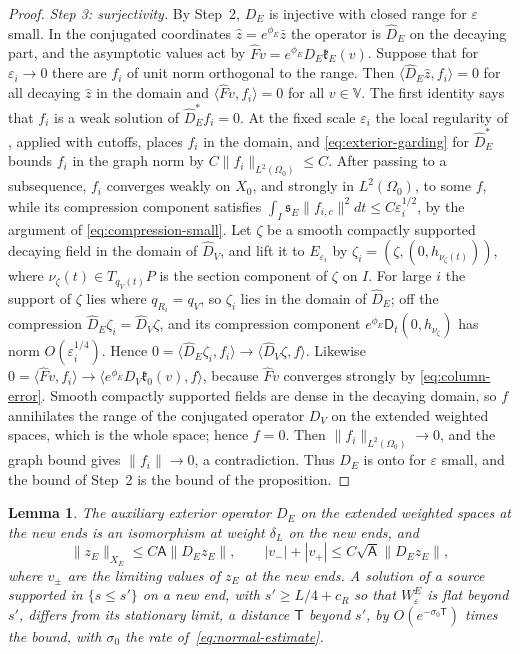 \documentclass[11pt]{amsart}
\newtheorem{lemma}[theorem]{Lemma}
\theoremstyle{definition}
\theoremstyle{remark}
\theoremstyle{plain}
\numberwithin{equation}{section}
\newcommand{\eps}{\varepsilon}
\begin{document}
\begin{proof}
\emph{Step 3: surjectivity.} By Step~2, $D_E$ is injective with closed range for
$\eps$ small. In the conjugated coordinates $\hat z=e^{\phi_E}\bar z$ the operator is
$\widehat D_E$ on the decaying part, and the asymptotic values act by $\widehat
Fv=e^{\phi_E}D_E\mathfrak k_E(v)$. Suppose that for $\eps_i\to0$ there are $f_i$ of
unit norm orthogonal to the range. Then $\langle\widehat D_E\hat z,f_i\rangle=0$
for all decaying $\hat z$ in the domain and $\langle\widehat Fv,f_i\rangle=0$ for all
$v\in\mathbb V$. The first identity says that $f_i$ is a weak solution of
$\widehat D_E^*f_i=0$. At the fixed scale $\eps_i$ the local regularity of
\cite[Theorem~4.17 and Remark~4.19]{DFL}, applied with cutoffs, places $f_i$ in the
domain, and \eqref{eq:exterior-garding} for $\widehat D_E^*$ bounds $f_i$ in the
graph norm by $C\|f_i\|_{L^2(\Omega_0)}\le C$. After passing to a subsequence, $f_i$
converges weakly on $X_0$, and strongly in $L^2(\Omega_0)$, to some $f$, while its
compression component satisfies $\int_I{\mathfrak s}_E\|f_{i,c}\|^2dt\le C\eps_i^{1/2}$, by
the argument of \eqref{eq:compression-small}. Let $\zeta$ be a smooth compactly
supported decaying field in the domain of $\widehat D_V$, and lift it to
$E_{\eps_i}$ by $\zeta_i=(\zeta,(0,h_{\nu_\zeta(t)}))$, where $\nu_\zeta(t)\in
T_{q_V(t)}P$ is the section component of $\zeta$ on $I$. For large $i$ the support of
$\zeta$ lies where $q_{R_i}=q_V$, so $\zeta_i$ lies in the domain of $\widehat D_E$;
off the compression $\widehat D_E\zeta_i=\widehat D_V\zeta$, and its compression
component $e^{\phi_E}\mathsf D_t(0,h_{\nu_\zeta})$ has norm $O(\eps_i^{1/4})$. Hence
$0=\langle\widehat D_E\zeta_i,f_i\rangle\to\langle\widehat D_V\zeta,f\rangle$.
Likewise $0=\langle\widehat Fv,f_i\rangle\to\langle e^{\phi_E}D_V\mathfrak
k_0(v),f\rangle$, because $\widehat Fv$ converges strongly by
\eqref{eq:column-error}. Smooth compactly supported fields are dense in the decaying
domain, so $f$ annihilates the range of the conjugated operator $D_V$ on the extended weighted spaces, which is the whole space; hence $f=0$. Then
$\|f_i\|_{L^2(\Omega_0)}\to0$, and the graph bound gives $\|f_i\|\to0$, a
contradiction. Thus $D_E$ is onto for $\eps$ small, and the bound of Step~2 is the
bound of the proposition.
\end{proof}

\begin{lemma}\label{lem:exterior-small-weight}
The auxiliary exterior operator $D_E$ on the extended weighted spaces at the new ends is an
isomorphism at weight $\delta_L$ on the new ends, and
\[
\|z_E\|_{X_E}\le C\mathsf A\|D_Ez_E\|,\qquad |v_-|+|v_+|\le C\sqrt{\mathsf A}\|D_Ez_E\|,
\]
where $v_\pm$ are the limiting values of $z_E$ at the new ends. A solution of a source
supported in $\{s\le s'\}$ on a new end, with $s'\ge L/4+c_R$ so that $W^E_\eps$ is flat
beyond $s'$, differs from its stationary limit, a distance $\mathsf T$ beyond $s'$, by
$O(e^{-\sigma_0\mathsf T})$ times the bound, with $\sigma_0$ the rate
of~\eqref{eq:normal-estimate}.
\end{lemma}
\end{document}
